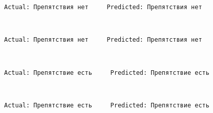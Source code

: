 \documentclass[11pt]{article}
\begin{document}
    \begin{Verbatim}[commandchars=\\\{\}]
Actual: Препятствия нет     Predicted: Препятствия нет

    \end{Verbatim}

    \begin{center}
    \end{center}
    { \hspace*{\fill} \\}
    
    \begin{Verbatim}[commandchars=\\\{\}]
Actual: Препятствия нет     Predicted: Препятствия нет

    \end{Verbatim}

    \begin{center}
    \end{center}
    { \hspace*{\fill} \\}
    
    \begin{Verbatim}[commandchars=\\\{\}]
Actual: Препятствие есть     Predicted: Препятствие есть

    \end{Verbatim}

    \begin{center}
    \end{center}
    { \hspace*{\fill} \\}
    
    \begin{Verbatim}[commandchars=\\\{\}]
Actual: Препятствие есть     Predicted: Препятствие есть

    \end{Verbatim}

    \begin{center}
    \end{center}
    { \hspace*{\fill} \\}
    
\end{document}
